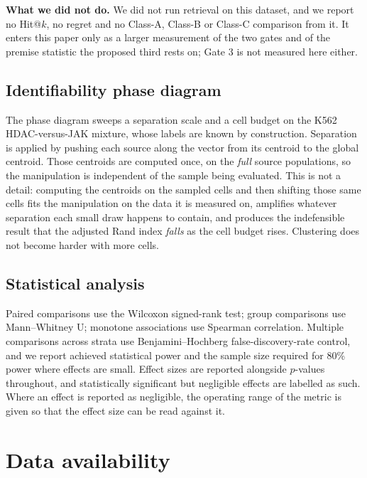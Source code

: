 \documentclass[11pt,letterpaper]{article}
\begin{document}
\textbf{What we did not do.} We did not run retrieval on this dataset, and we report no Hit@$k$,
no regret and no Class-A, Class-B or Class-C comparison from it. It enters this paper only as a
larger measurement of the two gates and of the premise statistic the proposed third rests on; Gate
3 is not measured here either.

\subsection*{Identifiability phase diagram}

The phase diagram sweeps a separation scale and a cell budget on the K562 HDAC-versus-JAK
mixture, whose labels are known by construction. Separation is applied by pushing each source
along the vector from its centroid to the global centroid. Those centroids are computed once,
on the \emph{full} source populations, so the manipulation is independent of the sample being
evaluated. This is not a detail: computing the centroids on the sampled cells and then
shifting those same cells fits the manipulation on the data it is measured on, amplifies
whatever separation each small draw happens to contain, and produces the indefensible result
that the adjusted Rand index \emph{falls} as the cell budget rises. Clustering does not become
harder with more cells.

\subsection*{Statistical analysis}

Paired comparisons use the Wilcoxon signed-rank test; group comparisons use Mann--Whitney U;
monotone associations use Spearman correlation. Multiple comparisons across strata use
Benjamini--Hochberg false-discovery-rate control\cite{BenjaminiHochberg}, and we report achieved statistical power and
the sample size required for 80\% power where effects are small. Effect sizes are reported
alongside $p$-values throughout, and statistically significant but negligible effects are
labelled as such. Where an effect is reported as negligible, the operating range of the metric
is given so that the effect size can be read against it.

\section*{Data availability}
\sloppy
\end{document}
